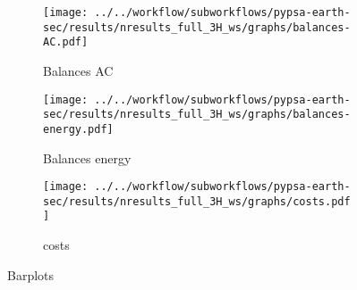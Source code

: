 \begin{figure}[h!]
    \centering
    \begin{subfigure}[b]{\linewidth}
        \centering
        \texttt{[image: ../../workflow/subworkflows/pypsa-earth-sec/results/nresults\_full\_3H\_ws/graphs/balances-AC.pdf]}
        \caption{Balances AC}
        \label{fig:balances_AC}
    \end{subfigure}
    
    \vspace{0.5cm} %
    
    \begin{subfigure}[b]{\linewidth}
        \centering
        \texttt{[image: ../../workflow/subworkflows/pypsa-earth-sec/results/nresults\_full\_3H\_ws/graphs/balances-energy.pdf]}
        \caption{Balances energy}
        \label{fig:balances_energy}
    \end{subfigure}

    \vspace{0.5cm} %
    
    \begin{subfigure}[b]{\linewidth}
        \centering
        \texttt{[image: ../../workflow/subworkflows/pypsa-earth-sec/results/nresults\_full\_3H\_ws/graphs/costs.pdf]}
        \caption{costs}
        \label{fig:balances_costs}
    \end{subfigure}
    
    \caption{Barplots}
    \label{fig:barplots}
\end{figure}








